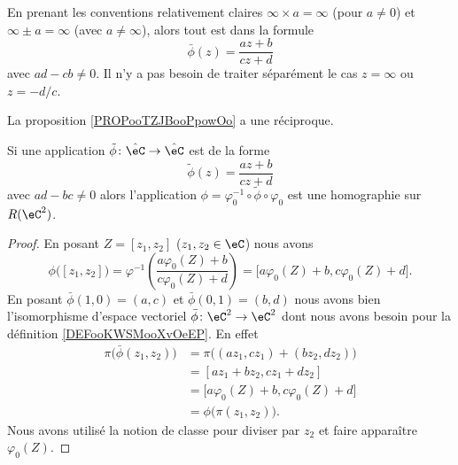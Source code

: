 \begin{remark}
    En prenant les conventions relativement claires \( \infty\times a=\infty\) (pour \( a\neq 0\)) et \( \infty\pm a=\infty\) (avec \( a\neq \infty\)), alors tout est dans la formule
    \begin{equation}
        \bar\phi(z)=\frac{ az+b }{ cz+d }
    \end{equation}
    avec \( ad-cb\neq 0\). Il n'y a pas besoin de traiter séparément le cas \( z=\infty\) ou \( z=-d/c\).
\end{remark}

La proposition \ref{PROPooTZJBooPpowOo} a une réciproque.

\begin{proposition}     \label{PROPooNAIDooJXgjHb}
    Si une application \( \tilde \phi\colon \hat\eC\to \hat \eC\) est de la forme
    \begin{equation}
        \tilde \phi(z)=\frac{ az+b }{ cz+d }
    \end{equation}
    avec \( ad-bc\neq 0\) alors l'application \( \phi=\varphi_0^{-1}\circ\tilde \phi\circ\varphi_0\) est une homographie sur \( R(\eC^2)\).
\end{proposition}

\begin{proof}
    En posant \( Z=[z_1,z_2]\) (\( z_1,z_2\in \eC\)) nous avons
    \begin{equation}
        \phi\big( [z_1,z_2] \big)=\varphi^{-1}\left( \frac{ a\varphi_0(Z)+b }{ c\varphi_0(Z)+d } \right)=\big[ a\varphi_0(Z)+b,c\varphi_0(Z)+d \big].
    \end{equation}
    En posant \( \bar\phi(1,0)=(a,c)\) et \( \bar\phi(0,1)=(b,d)\) nous avons bien l'isomorphisme d'espace vectoriel \( \bar\phi\colon \eC^2\to \eC^2\) dont nous avons besoin pour la définition \ref{DEFooKWSMooXvOeEP}. En effet
    \begin{subequations}
        \begin{align}
            \pi\big( \bar\phi(z_1,z_2) \big)&=\pi\big( (az_1,cz_1)+(bz_2,dz_2) \big)\\
            &=[az_1+bz_2,cz_1+dz_2]\\
            &=\big[ a\varphi_0(Z)+b,c\varphi_0(Z)+d \big]\\
            &=\phi\big( \pi(z_1,z_2) \big).
        \end{align}
    \end{subequations}
    Nous avons utilisé la notion de classe pour diviser par \( z_2\) et faire apparaître \( \varphi_0(Z)\).
\end{proof}

